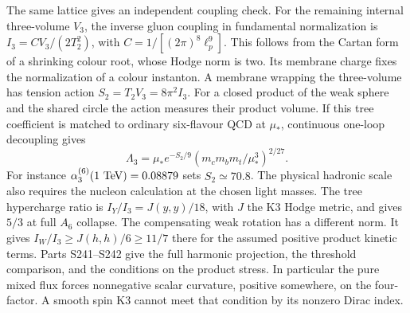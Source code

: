 \documentclass[aps,prd,reprint,onecolumn,nofootinbib,amsmath,amssymb]{revtex4-2}
\begin{document}
The same lattice gives an independent coupling check. For the remaining internal three-volume $V_3$, the inverse gluon coupling in fundamental normalization is $I_3=CV_3/(2T_2^2)$, with $C=1/[(2\pi)^8\ell_p^9]$. This follows from the Cartan form of a shrinking colour root, whose Hodge norm is two. Its membrane charge fixes the normalization of a colour instanton. A membrane wrapping the three-volume has tension action $S_2=T_2V_3=8\pi^2 I_3$. For a closed product of the weak sphere and the shared circle the action measures their product volume. If this tree coefficient is matched to ordinary six-flavour QCD at $\mu_*$, continuous one-loop decoupling gives
\begin{equation}
 \Lambda_3=\mu_*e^{-S_2/9}
       (m_c m_b m_t/\mu_*^3)^{2/27}.
\end{equation}
For instance $\alpha_3^{(6)}(1~{\rm TeV})=0.08879$ sets $S_2\simeq70.8$. The physical hadronic scale also requires the nucleon calculation at the chosen light masses. The tree hypercharge ratio is $I_Y/I_3=J(y,y)/18$, with $J$ the K3 Hodge metric, and gives $5/3$ at full $A_6$ collapse. The compensating weak rotation has a different norm. It gives $I_W/I_3\geq J(h,h)/6\geq11/7$ there for the assumed positive product kinetic terms. Parts S241--S242 give the full harmonic projection, the threshold comparison, and the conditions on the product stress. In particular the pure mixed flux forces nonnegative scalar curvature, positive somewhere, on the four-factor. A smooth spin K3 cannot meet that condition by its nonzero Dirac index.
\end{document}
